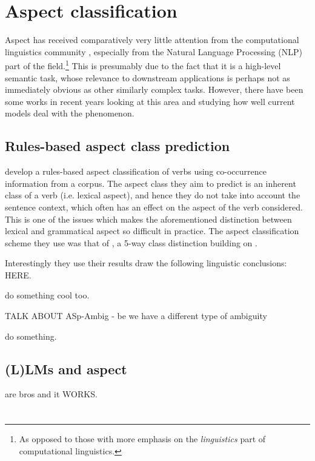 \section{Aspect classification}
\label{sect:previous_asp_class}
Aspect has received comparatively very little attention from the computational linguistics community \citep{friedrich-etal-2023-kind}, especially from the Natural Language Processing (NLP) part of the field.\footnote{As opposed to those with more emphasis on the \emph{linguistics} part of computational linguistics.} This is presumably due to the fact that it is a high-level semantic task, whose relevance to downstream applications is perhaps not as immediately obvious as other similarly complex tasks. However, there have been some works in recent years looking at this area and studying how well current models deal with the phenomenon.

\subsection{Rules-based aspect class prediction}
\citet{siegel-mckeown-2000-learning} develop a rules-based aspect classification of verbs using co-occurrence information from a corpus. The aspect class they aim to predict is an inherent class of a verb (i.e. lexical aspect), and hence they do not take into account the sentence context, which often has an effect on the aspect of the verb considered. This is one of the issues which makes the aforementioned distinction between lexical and grammatical aspect so difficult in practice. The aspect classification scheme they use was that of \citet{moens-steedman-1988-temporal}, a 5-way class distinction building on \citet{vendler57}.

Interestingly they use their results draw the following linguistic conclusions: HERE.

\citet{annotAndAutoClassOfAspectCat} do something cool too.

TALK ABOUT ASp-Ambig - be we have a different type of ambiguity

\citet{chen-etal-2021-autoaspect} do something.

\subsection{(L)LMs and aspect}
\citet{metheniti-etal-2022-time} are bros and it WORKS.

\section*{\citet{katinskaia2024probing}}

